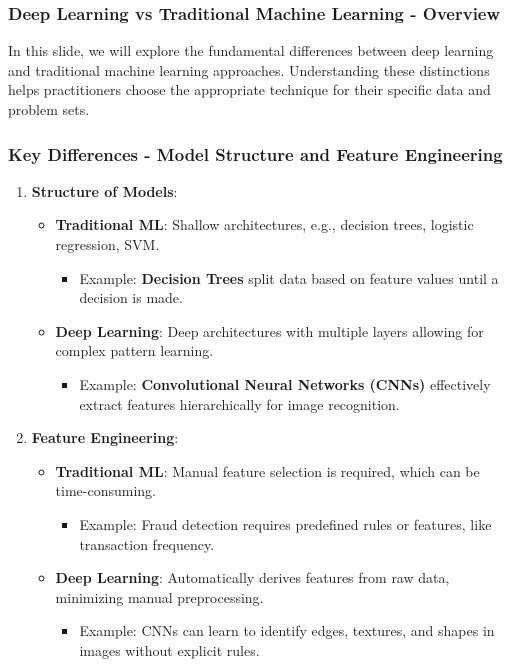\documentclass[aspectratio=169]{beamer}
\begin{document}
\begin{frame}[fragile]
    \frametitle{Deep Learning vs Traditional Machine Learning - Overview}
    In this slide, we will explore the fundamental differences between deep learning and traditional machine learning approaches. Understanding these distinctions helps practitioners choose the appropriate technique for their specific data and problem sets.
\end{frame}

\begin{frame}[fragile]
    \frametitle{Key Differences - Model Structure and Feature Engineering}
    \begin{enumerate}
        \item \textbf{Structure of Models}:
        \begin{itemize}
            \item \textbf{Traditional ML}: Shallow architectures, e.g., decision trees, logistic regression, SVM.
                \begin{itemize}
                    \item Example: \textbf{Decision Trees} split data based on feature values until a decision is made.
                \end{itemize}
            \item \textbf{Deep Learning}: Deep architectures with multiple layers allowing for complex pattern learning.
                \begin{itemize}
                    \item Example: \textbf{Convolutional Neural Networks (CNNs)} effectively extract features hierarchically for image recognition.
                \end{itemize}
        \end{itemize}
        
        \item \textbf{Feature Engineering}:
        \begin{itemize}
            \item \textbf{Traditional ML}: Manual feature selection is required, which can be time-consuming.
                \begin{itemize}
                    \item Example: Fraud detection requires predefined rules or features, like transaction frequency.
                \end{itemize}
            \item \textbf{Deep Learning}: Automatically derives features from raw data, minimizing manual preprocessing.
                \begin{itemize}
                    \item Example: CNNs can learn to identify edges, textures, and shapes in images without explicit rules.
                \end{itemize}
        \end{itemize}
    \end{enumerate}
\end{frame}
\end{document}
